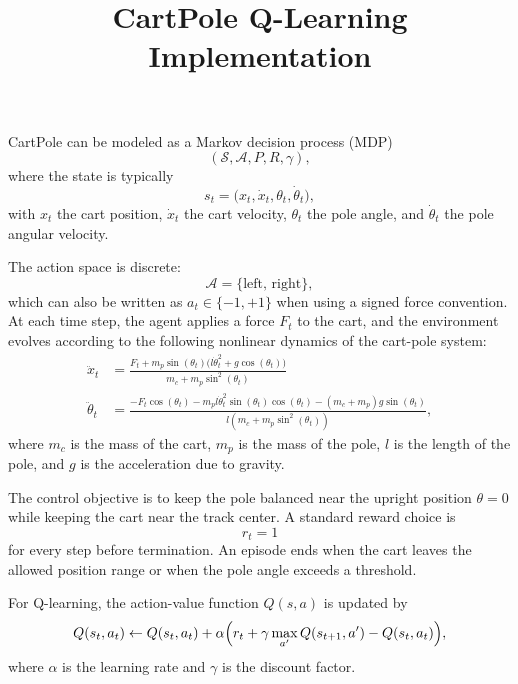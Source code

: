\documentclass[11pt]{article}
\title{CartPole Q-Learning Implementation}
\begin{document}
\maketitle



CartPole can be modeled as a Markov decision process (MDP)
\[
(\mathcal{S}, \mathcal{A}, P, R, \gamma),
\]
where the state is typically
\[
s_t = \bigl(x_t, \dot{x}_t, \theta_t, \dot{\theta}_t\bigr),
\]
with $x_t$ the cart position, $\dot{x}_t$ the cart velocity, $\theta_t$ the pole angle, and $\dot{\theta}_t$ the pole angular velocity.

The action space is discrete:
\[
\mathcal{A} = \{\text{left},\,\text{right}\},
\]
which can also be written as $a_t \in \{-1, +1\}$ when using a signed force convention. At each time step, the agent applies a force $F_t$ to the cart, and the environment 
evolves according to the following nonlinear dynamics of the cart-pole system: 
\begin{align*}
\ddot{x}_t &= \frac{F_t + m_p \sin(\theta_t) \bigl(l \dot{\theta}_t^2 + g \cos(\theta_t)\bigr)}{m_c + m_p \sin^2(\theta_t)} \\
\ddot{\theta}_t &= \frac{-F_t \cos(\theta_t) - m_p l \dot{\theta}_t^2 \sin(\theta_t) \cos(\theta_t) - (m_c + m_p) g \sin(\theta_t)}{l (m_c + m_p \sin^2(\theta_t))},
\end{align*}
where $m_c$ is the mass of the cart, $m_p$ is the mass of the pole, $l$ is the length of the pole, and $g$ is the acceleration due to gravity. 

The control objective is to keep the pole balanced near the upright position $\theta = 0$ while keeping the cart near the track center. A standard reward choice is
\[
r_t = 1
\]
for every step before termination. An episode ends when the cart leaves the allowed position range or when the pole angle exceeds a threshold.

For Q-learning, the action-value function $Q(s,a)$ is updated by
\[
Q(s_t, a_t) \leftarrow Q(s_t, a_t) + \alpha
\Bigl(r_t + \gamma \max_{a'} Q(s_{t+1}, a') - Q(s_t, a_t)\Bigr),
\]
where $\alpha$ is the learning rate and $\gamma$ is the discount factor.
\end{document}
